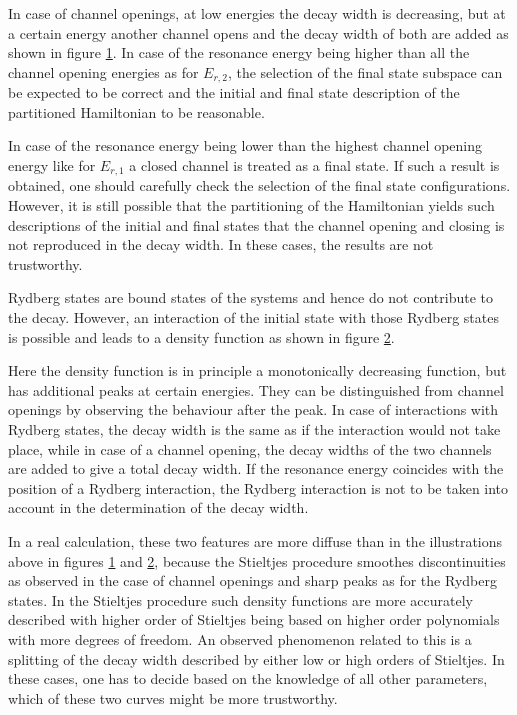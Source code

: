 \begin{figure}[h]
  \centering
  
  \caption{}
  \label{figure:prof_channel_opening}
\end{figure}
In case of channel openings, at low energies the decay width is decreasing, but
at a certain energy another channel opens and the decay width of both are
added as shown in figure \ref{figure:prof_channel_opening}. In case of the
resonance energy being higher than all the channel opening energies as for
$E_{r,2}$, the
selection of the final state subspace can be expected to be correct
and the initial
and final state description of the partitioned Hamiltonian to be reasonable.

In case of the resonance energy being lower than the highest channel
opening energy like for $E_{r,1}$ a closed channel is treated as a final
state. If such a result is obtained, one should carefully check the selection
of the final state configurations. However, it is still possible that the
partitioning of the Hamiltonian yields such descriptions of the initial and
final states that the channel opening and closing is not reproduced in the
decay width. In these cases, the results are not trustworthy.

Rydberg states are bound states of the systems and hence do not contribute
to the decay. However, an interaction of the initial state with those
Rydberg states is possible and leads to a density function as shown in
figure \ref{figure:prof_rydberg}.

\begin{figure}[h]
  \centering
  
  \caption{}
  \label{figure:prof_rydberg}
\end{figure}
Here the density function is in principle a monotonically decreasing function,
but has additional peaks at certain energies. They can be distinguished from
channel openings by observing the behaviour after the peak. In case of
interactions with Rydberg states, the decay width is the same as if the interaction
would not take place, while in case of a channel opening, the decay widths
of the two channels are added to give a total decay width.
If the resonance energy coincides with the position of a Rydberg interaction,
the Rydberg interaction is not to be taken into account in the determination
of the decay width.

In a real calculation, these two features are more diffuse than in the
illustrations above in
figures \ref{figure:prof_channel_opening}
and \ref{figure:prof_rydberg}, because the Stieltjes procedure smoothes
discontinuities as observed in the case of channel openings and sharp peaks
as for the Rydberg states.
In the Stieltjes procedure such density functions are more accurately described
with higher order of Stieltjes being based on higher order polynomials
with more degrees of freedom.
An observed phenomenon related to this is
a splitting of the decay width described by either low or high orders of Stieltjes.
In these cases, one has to decide based on the knowledge of all other
parameters, which of these two curves might be more trustworthy.

